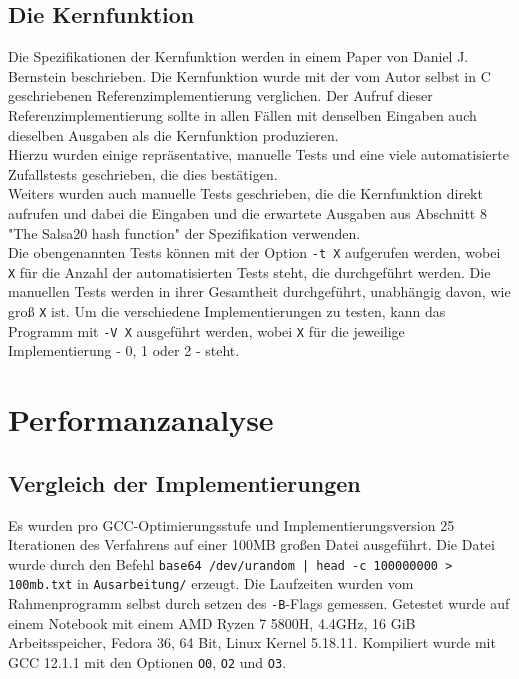 \documentclass[course=erap]{aspdoc}
\begin{document}
\subsection{Die Kernfunktion}
Die Spezifikationen der Kernfunktion werden in einem Paper von Daniel J. Bernstein beschrieben.\cite{salsa20specification}
Die Kernfunktion wurde mit der vom Autor selbst in C geschriebenen Referenzimplementierung verglichen.\cite{salsa20}
Der Aufruf dieser Referenzimplementierung sollte in allen Fällen mit denselben Eingaben auch dieselben Ausgaben
als die Kern\-funk\-tion produzieren. 
\\Hierzu wurden einige repräsentative, manuelle Tests und eine viele automatisierte Zufallstests 
geschrieben, die dies bestätigen.
\\Weiters wurden auch manuelle Tests geschrieben, die die Kernfunktion direkt aufrufen und dabei 
die Eingaben und die erwartete Ausgaben aus Abschnitt 8 "The Salsa20 hash function" der Spezifikation 
verwenden.\cite{salsa20specification}
\\Die obengenannten Tests können mit der Option \texttt{-t X} aufgerufen werden, wobei \texttt{X} für die Anzahl der automatisierten 
Tests steht, die durchgeführt werden. Die manuellen Tests werden in ihrer Gesamtheit durchgeführt, unabhängig davon, 
wie groß \texttt{X} ist. Um die verschiedene Implementierungen zu testen, kann das Programm mit \texttt{-V X} ausgeführt werden, 
wobei \texttt{X} für die jeweilige Implementierung - 0, 1 oder 2 - steht.


\section{Performanzanalyse} \label{perf}
\subsection{Vergleich der Implementierungen}
Es wurden pro GCC-Optimierungsstufe und Implementierungsversion 25 
Iterationen des Verfahrens auf einer 100MB großen Datei ausgeführt. Die Datei
wurde durch den Befehl \texttt{base64 /dev/urandom | head -c 100000000 > 100mb.txt}
in \texttt{Ausarbeitung/} er\-zeugt.
Die Laufzeiten wurden vom Rahmenprogramm selbst durch setzen des \texttt{-B}-Flags
gemessen. Getestet wurde auf einem Notebook mit einem AMD Ryzen 7 5800H, 
4.4GHz, 16 GiB Arbeitsspeicher, Fedora 36, 64 Bit, Linux Kernel 5.18.11.
Kompiliert wurde mit GCC 12.1.1 mit den Optionen \texttt{O0}, \texttt{O2} und \texttt{O3}.
\end{document}
